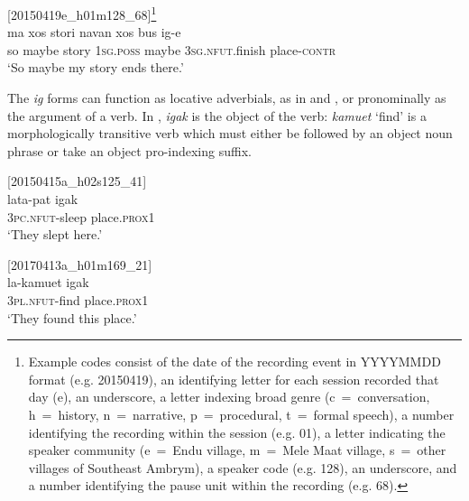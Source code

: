 \documentclass[output=paper,colorlinks,citecolor=brown]{langscibook}
\begin{document}
\ea{}
[20150419e\_h01m128\_68]\label{ex:ridge:1}\footnote{Example
    codes consist of the date of the recording event in YYYYMMDD format (e.g. 20150419), an identifying letter for each session recorded that day (e), an underscore, a letter indexing broad genre (c~=~conversation, h~=~history, n~=~narrative, p~=~procedural, t~=~formal speech), a number identifying the recording within the session (e.g. 01), a letter indicating the speaker community (e~=~Endu village, m~=~Mele Maat village, s~=~other villages of Southeast Ambrym), a speaker code (e.g. 128), an underscore, and a number identifying the pause unit within the recording (e.g. 68).
    }\\
\gll ma  xos  stori  navan    xos  bus      ig-e\footnotemark{}\\
     so  maybe   story  \textsc{1sg.poss}  maybe   \textsc{3sg.nfut}.finish  place-\textsc{contr}\\
\glt ‘So maybe my story ends there.’
\z
{}


{The \textit{ig} forms can function as locative adverbials, as in  and , or pronominally as the argument of a verb. In , \textit{igak} is the object of the verb: \textit{kamuet} ‘find’ is a morphologically transitive verb which must either be followed by an object noun phrase or take an object pro-indexing suffix.}

\ea
{\label{ex:ridge:2}[20150415a\_h02s125\_41]}\\
\gll lata-pat      igak\\
     \textsc{3pc.nfut}{}-sleep    place.\textsc{prox1}\\
\glt ‘They slept here.’
\z

\ea
{\label{ex:ridge:3}[20170413a\_h01m169\_21]} \\
\gll la-kamuet  igak\\
     \textsc{3pl.nfut-}find  place.\textsc{prox1}\\
\glt ‘They found this place.’
\z
\end{document}
